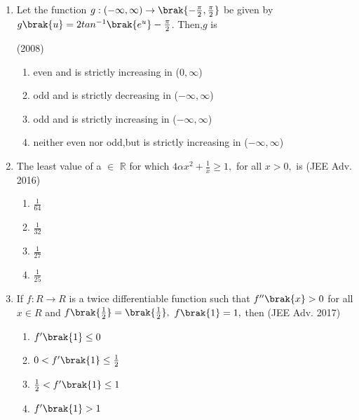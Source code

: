 \documentclass[journal,12pt,twocolumn]{IEEEtran}
\theoremstyle{remark}
\begin{document}
\begin{enumerate}
   \item 
	 Let the function $g:(-\infty,\infty) \rightarrow  \brak{-\frac{\pi}{2},\frac{\pi}{2}}$ be given by $g\brak{u}= 2 tan^{-1}\brak{e^u}-\frac{\pi}{2}$. Then,$g$ is  
   
   \hfill(2008)
   \begin{enumerate}

   \item even and is strictly increasing in ($0,\infty$)
 
   \item odd and is strictly decreasing in ($-\infty,\infty$)


   \item odd and is strictly increasing in ($-\infty,\infty$)

   \item neither even nor odd,but is strictly increasing in ($-\infty,\infty$) \\

   \end{enumerate}    

 
     \item 
	     The least value of a $\in$ $\mathbb{R}$ for which $4\alpha x^{2} + \frac{1}{x} \ge 1,$ for all $x>0,$ is 
     \hfill(JEE Adv. 2016)
     \begin{enumerate}
      \item $\frac{1}{64}$
      \item $\frac{1}{32}$
      \item $\frac{1}{27}$
      \item $\frac{1}{25}$\\
     \end{enumerate}
     
     \item
        If $f: R \rightarrow R$ is a twice differentiable function such that $f^{\prime\prime}\brak{x}>0$ for all $x \in R$ and $f\brak{\frac{1}{2}} = \brak{\frac{1}{2}},$ $f\brak{1}=1,$ then
     \hfill(JEE Adv. 2017) 

     \begin{enumerate}
	 \item $f^{\prime}\brak{1} \le 0$ 
	 \item $0<f^{\prime}\brak{1} \le \frac{1}{2}$
	 \item $\frac{1}{2} < f^{\prime}\brak{1}\le 1$ 
	 \item $f^{\prime}\brak{1} > 1$\\
    \end{enumerate}
  \end{enumerate}
 
\end{document}
